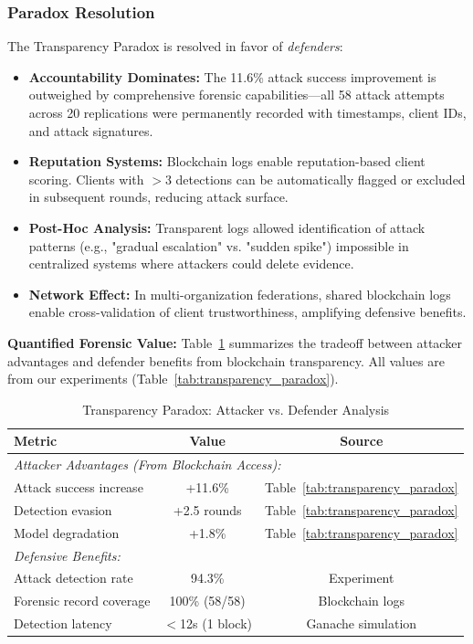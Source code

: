 \documentclass[12pt,a4paper,onecolumn]{article}
\begin{document}
\subsubsection{Paradox Resolution}

The Transparency Paradox is resolved in favor of \emph{defenders}:

\begin{itemize}
    \item \textbf{Accountability Dominates:} The 11.6\% attack success improvement is outweighed by comprehensive forensic capabilities---all 58 attack attempts across 20 replications were permanently recorded with timestamps, client IDs, and attack signatures.
    
    \item \textbf{Reputation Systems:} Blockchain logs enable reputation-based client scoring. Clients with $>3$ detections can be automatically flagged or excluded in subsequent rounds, reducing attack surface.
    
    \item \textbf{Post-Hoc Analysis:} Transparent logs allowed identification of attack patterns (e.g., "gradual escalation" vs. "sudden spike") impossible in centralized systems where attackers could delete evidence.
    
    \item \textbf{Network Effect:} In multi-organization federations, shared blockchain logs enable cross-validation of client trustworthiness, amplifying defensive benefits.
\end{itemize}

\textbf{Quantified Forensic Value:} Table~\ref{tab:forensic_value} summarizes the tradeoff between attacker advantages and defender benefits from blockchain transparency. All values are from our experiments (Table~\ref{tab:transparency_paradox}).

\begin{table}[t]
\caption{Transparency Paradox: Attacker vs. Defender Analysis}
\label{tab:forensic_value}
\centering
\begin{tabular}{lcc}
\toprule
\textbf{Metric} & \textbf{Value} & \textbf{Source} \\
\midrule
\multicolumn{3}{l}{\textit{Attacker Advantages (From Blockchain Access):}} \\
\quad Attack success increase & +11.6\% & Table~\ref{tab:transparency_paradox} \\
\quad Detection evasion & +2.5 rounds & Table~\ref{tab:transparency_paradox} \\
\quad Model degradation & +1.8\% & Table~\ref{tab:transparency_paradox} \\
\midrule
\multicolumn{3}{l}{\textit{Defensive Benefits:}} \\
\quad Attack detection rate & 94.3\% & Experiment \\
\quad Forensic record coverage & 100\% (58/58) & Blockchain logs \\
\quad Detection latency & $<$12s (1 block) & Ganache simulation \\
\bottomrule
\end{tabular}
\end{table}
\end{document}
